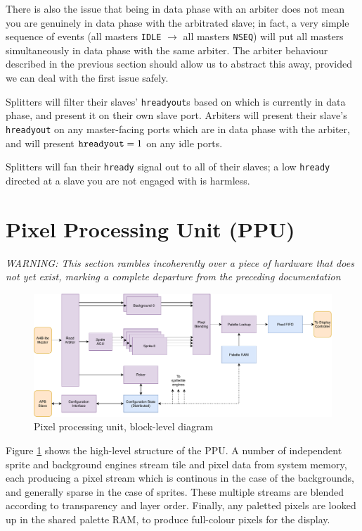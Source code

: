 \documentclass[notitlepage]{article}
\begin{document}
There is also the issue that being in data phase with an arbiter does not mean you are genuinely in data phase with the arbitrated slave; in fact, a very simple sequence of events (all masters {\tt IDLE} $\to$ all masters {\tt NSEQ}) will put all masters simultaneously in data phase with the same arbiter. The arbiter behaviour described in the previous section should allow us to abstract this away, provided we can deal with the first issue safely.

Splitters will filter their slaves' {\tt hreadyout}s based on which is currently in data phase, and present it on their own slave port. Arbiters will present their slave's {\tt hreadyout} on any master-facing ports which are in data phase with the arbiter, and will present ${\tt hreadyout} = 1$ on any idle ports.

Splitters will fan their {\tt hready} signal out to all of their slaves; a low {\tt hready} directed at a slave you are not engaged with is harmless.



\section{Pixel Processing Unit (PPU)}

{\it WARNING: This section rambles incoherently over a piece of hardware that does not yet exist, marking a complete departure from the preceding documentation}

\begin{figure}[!htb]
\centering
\caption{Pixel processing unit, block-level diagram}
\label{diagram:ppu_block}
\includegraphics[width=\textwidth]{diagrams/ppu_block.pdf}
\end{figure}

Figure \ref{diagram:ppu_block} shows the high-level structure of the PPU. A number of independent sprite and background engines stream tile and pixel data from system memory, each producing a pixel stream which is continous in the case of the backgrounds, and generally sparse in the case of sprites. These multiple streams are blended according to transparency and layer order. Finally, any paletted pixels are looked up in the shared palette RAM, to produce full-colour pixels for the display.
\end{document}
